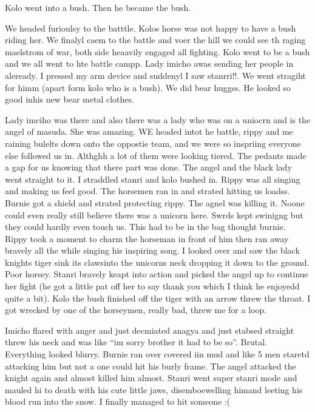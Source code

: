 \begin{multicols}{2}
Kolo went into a bush. Then he became the bush.\medskip

We headed furioulsy to the batttle. Kolos horse was not happy to have a bush riding her. We finalyl caem to the battle and voer the hill we could see th raging maelstrom of war, both side heaavily engaged all fighting. Kolo went to be a bush and we all went to hte battle campp. Lady imicho awas sending her people in aleready. I pressed my arm device and suddenyl I saw stanrri!!. We went stragiht for himm (apart form kolo who is a bush). We did bear huggss. He looked so good inhis new bear metal clothes.\medskip

Lady imciho was there and also there was a lady who was on a uniocrn and is the angel of masuda. She was amazing. WE headed intot he battle, rippy and me raining bulelts down onto the oppostie team, and we were so inspriing everyone else followed us in. Althghh a lot of them were looking tiered. The pedants made a gap for us knowing that there part was done. The angel and the black lady went straight to it. I straddled stanri and kolo bushed in. Rippy was all singing and making us feel good. The horsemen ran in and strated hitting us loadss. Burnie got a shield and strated protecting rippy. The agnel was killing it. Noone could even really still believe there was a unicorn here. Swrds kept swinigng but they could hardly even touch us. This had to be in the bag thought burnie. Rippy took a moment to charm the horseman in front of him then ran away bravely all the while singing his inspiring song. I looked over and saw the black knights tiger sink its clawsinto the unicorns neck dropping it down to the ground. Poor horsey. Stanri bravely keapt into action and picked the angel up to continue her fight (he got a little pat off her to say thank you which I think he enjoyedd quite a bit). Kolo the bush finished off the tiger with an arrow threw the throat. I got wrecked by one of the horseymen, really bad, threw me for a loop.\medskip

Imicho flared with anger and just decmiated anagya and just stabsed straight threw his neck and was like “im sorry brother it had to be so”. Brutal. Everything looked blurry. Burnie ran over covered iin mud and like 5 men staretd attacking him but not a one could hit his burly frame. The angel attacked the knight again and almost killed him almost. Stanri went super stanri mode and mauled hi to death with his cute little jaws, disemboewelling himand leeting his blood run into the snow. I finally managed to hit someone :(\medskip


\end{multicols}

